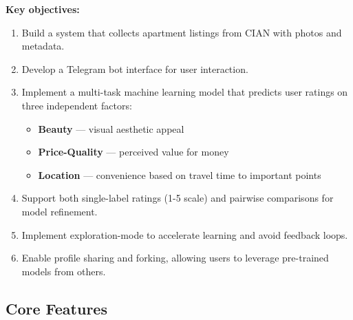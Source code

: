 \documentclass[12pt,a4paper]{article}
\begin{document}
\textbf{Key objectives:}
\begin{enumerate}
    \item Build a system that collects apartment listings from CIAN with photos and metadata.
    \item Develop a Telegram bot interface for user interaction.
    \item Implement a multi-task machine learning model that predicts user ratings on three independent factors:
    \begin{itemize}
        \item \textbf{Beauty} — visual aesthetic appeal
        \item \textbf{Price-Quality} — perceived value for money
        \item \textbf{Location} — convenience based on travel time to important points
    \end{itemize}
    \item Support both single-label ratings (1-5 scale) and pairwise comparisons for model refinement.
    \item Implement exploration-mode to accelerate learning and avoid feedback loops.
    \item Enable profile sharing and forking, allowing users to leverage pre-trained models from others.
\end{enumerate}

\subsection{Core Features}
\end{document}
